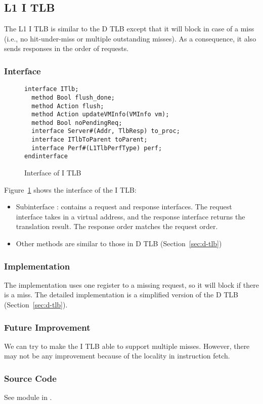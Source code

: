 \subsection{L1 I TLB}

The L1 I TLB is similar to the D TLB except that it will block in case of a miss (i.e., no hit-under-miss or multiple outstanding misses).
As a consequence, it also sends responses in the order of requests.

\subsubsection{Interface}

\begin{figure}
\begin{lstlisting}[caption={}]
interface ITlb;
  method Bool flush_done;
  method Action flush;
  method Action updateVMInfo(VMInfo vm);
  method Bool noPendingReq;
  interface Server#(Addr, TlbResp) to_proc;
  interface ITlbToParent toParent;
  interface Perf#(L1TlbPerfType) perf;
endinterface
\end{lstlisting}
\caption{Interface of I TLB}\label{fig:i-tlb-ifc}
\end{figure}

Figure~\ref{fig:i-tlb-ifc} shows the interface of the I TLB:
\begin{itemize}
    \item Subinterface : contains a request and response interfaces.
    The request interface takes in a virtual address, and the response interface returns the translation result.
    The response order matches the request order.
    \item Other methods are similar to those in D TLB (Section~\ref{sec:d-tlb})
\end{itemize}

\subsubsection{Implementation}
The implementation uses one register to a missing request, so it will block if there is a miss.
The detailed implementation is a simplified version of the D TLB (Section~\ref{sec:d-tlb}).

\subsubsection{Future Improvement}
We can try to make the I TLB able to support multiple misses.
However, there may not be any improvement because of the locality in instruction fetch.

\subsubsection{Source Code}
See module  in .
